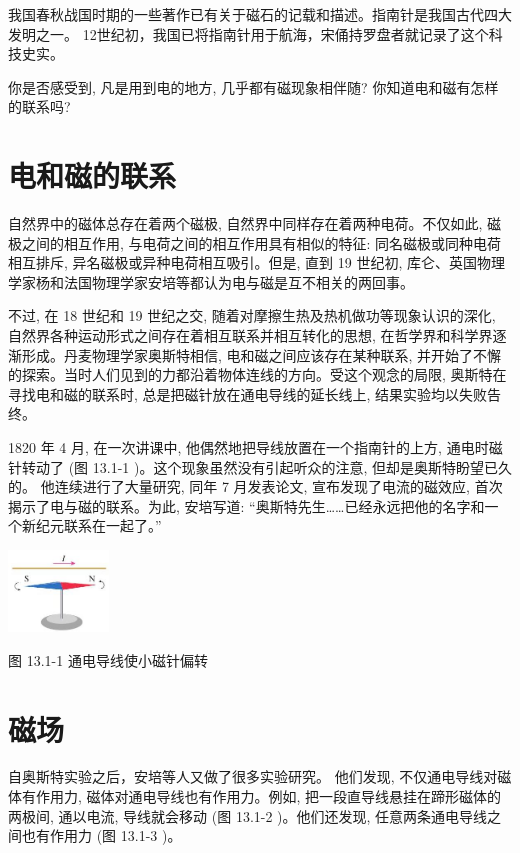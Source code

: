 \documentclass[10pt]{article}
\begin{document}
我国春秋战国时期的一些著作已有关于磁石的记载和描述。指南针是我国古代四大发明之一。 12世纪初，我国已将指南针用于航海，宋俑持罗盘者就记录了这个科技史实。

你是否感受到, 凡是用到电的地方, 几乎都有磁现象相伴随? 你知道电和磁有怎样的联系吗?

\section*{电和磁的联系}

自然界中的磁体总存在着两个磁极, 自然界中同样存在着两种电荷。不仅如此, 磁极之间的相互作用, 与电荷之间的相互作用具有相似的特征: 同名磁极或同种电荷相互排斥, 异名磁极或异种电荷相互吸引。但是, 直到 19 世纪初, 库仑、英国物理学家杨和法国物理学家安培等都认为电与磁是互不相关的两回事。

不过, 在 18 世纪和 19 世纪之交, 随着对摩擦生热及热机做功等现象认识的深化, 自然界各种运动形式之间存在着相互联系并相互转化的思想, 在哲学界和科学界逐渐形成。丹麦物理学家奥斯特相信, 电和磁之间应该存在某种联系, 并开始了不懈的探索。当时人们见到的力都沿着物体连线的方向。受这个观念的局限, 奥斯特在寻找电和磁的联系时, 总是把磁针放在通电导线的延长线上, 结果实验均以失败告终。

1820 年 4 月, 在一次讲课中, 他偶然地把导线放置在一个指南针的上方, 通电时磁针转动了 (图 13.1-1 )。这个现象虽然没有引起听众的注意, 但却是奥斯特盼望已久的。 他连续进行了大量研究, 同年 7 月发表论文, 宣布发现了电流的磁效应, 首次揭示了电与磁的联系。为此, 安培写道: “奥斯特先生……已经永远把他的名字和一个新纪元联系在一起了。”

\begin{center}
\includegraphics[max width=0.2\textwidth]{images/01911d5f-8e38-70c0-b5b8-2b399bd115b6_110_871126.jpg}
\end{center}

图 13.1-1 通电导线使小磁针偏转

\section*{磁场}

自奥斯特实验之后，安培等人又做了很多实验研究。 他们发现, 不仅通电导线对磁体有作用力, 磁体对通电导线也有作用力。例如, 把一段直导线悬挂在蹄形磁体的两极间, 通以电流, 导线就会移动 (图 13.1-2 )。他们还发现, 任意两条通电导线之间也有作用力 (图 13.1-3 )。
\end{document}
